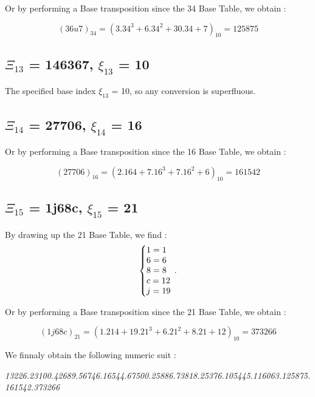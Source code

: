 \documentclass{article}
\begin{document}
\begin{flushleft}
	Or by performing a Base transposition since the 34 Base Table, we obtain :
\end{flushleft}
\begin{equation}
(36u7)_{34}=(3.34^{3}+6.34^{2}+30.34+7)_{10}=125 875
\end{equation}

\subsection{$\Xi_{13}$ = 146367, $\xi_{13}$ = 10}
The specified base index $\xi_{13}$ = 10, so any conversion is superfluous.

\subsection{$\Xi_{14}$ = 27706, $\xi_{14}$ = 16}

\begin{flushleft}
	Or by performing a Base transposition since the 16 Base Table, we obtain :
\end{flushleft}
\begin{equation}
(27706)_{16}=(2.16{4}+7.16^{3}+7.16^{2}+6)_{10}=161542
\end{equation}

\subsection{$\Xi_{15}$ = 1j68c, $\xi_{15}$ = 21}
By drawing up the 21 Base Table, we find :
\begin{equation}
\centering
\left\{\begin{array}{@{}l@{}}
1=1 \\
6=6 \\
8=8 \\
c=12 \\
j=19 \\
\end{array}\right.\,.
\end{equation}

\begin{flushleft}
	Or by performing a Base transposition since the 21 Base Table, we obtain :
\end{flushleft}
\begin{equation}
(1j68c)_{21}=(1.21{4}+19.21^{3}+6.21^{2}+8.21+12)_{10}=373266
\end{equation}

\begin{center}
	We finnaly obtain the following numeric suit :
	
\textit{13226.23100.42689.56746.16544.67500.25886.73818.25376.105445.116063.125875.161542.373266}
\end{center}
\end{document}
